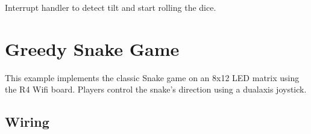 \documentclass[a4paper,11pt,english]{sphinxmanual}
\begin{document}
\begin{enumerate}
\sphinxAtStartPar
Interrupt handler to detect tilt and start rolling the dice.

\begin{sphinxVerbatim}[commandchars=\\\{\}]
\end{sphinxVerbatim}

\end{enumerate}

\sphinxstepscope


\section{Greedy Snake Game}
\label{\detokenize{Extension_Project/Greedy_Snake_Game:greedy-snake-game}}\label{\detokenize{Extension_Project/Greedy_Snake_Game:ext-greedy-snake-game}}\label{\detokenize{Extension_Project/Greedy_Snake_Game::doc}}
\sphinxAtStartPar
This example implements the classic Snake game on an 8x12 LED matrix using the R4 Wifi board.
Players control the snake’s direction using a dual\sphinxhyphen{}axis joystick.


\subsection{Wiring}
\label{\detokenize{Extension_Project/Greedy_Snake_Game:wiring}}

\sphinxAtStartPar
{}

\end{document}
